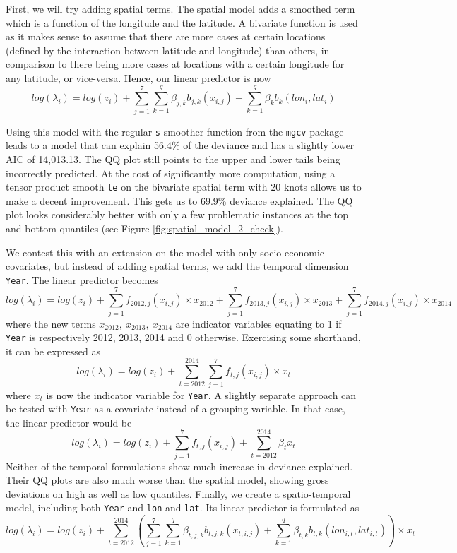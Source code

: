 First, we will try adding spatial terms. The spatial model adds a smoothed term which is a function of the longitude and the latitude. A bivariate function is used as it makes sense to assume that there are more cases at certain locations (defined by the interaction between latitude and longitude) than others, in comparison to there being more cases at
locations with a certain longitude for any latitude, or vice-versa. Hence, our linear predictor is now
$$
log(\lambda_i) = log(z_i) +  \sum_{j=1}^{7}\sum_{k=1}^{q}\beta_{j,k}b_{j,k}(x_{i,j}) + \sum_{k=1}^{q}\beta_{k}b_{k}(lon_i , lat_i) 
$$

Using this model with the regular \texttt{s} smoother function from the \texttt{mgcv} package leads to a model that can explain 56.4\% of the deviance and has a slightly lower AIC of 14,013.13. The QQ plot still points to the upper and lower tails being incorrectly predicted. At the cost of significantly more computation, using a tensor product smooth \texttt{te} on the bivariate spatial term with 20 knots allows us to make a decent improvement. This gets us to 69.9\% deviance explained. The QQ plot looks considerably better with only a few problematic instances at the top and bottom quantiles (see Figure \ref{fig:spatial_model_2_check}).

We contest this with an extension on the model with only socio-economic covariates, but instead of adding spatial terms, we add the temporal dimension \texttt{Year}. The linear predictor becomes
$$
log(\lambda_i) = log(z_i) +  \sum_{j=1}^{7}f_{2012, j}(x_{i,j})\times x_{2012}  + \sum_{j=1}^{7}f_{2013, j}(x_{i,j})\times x_{2013} +  \sum_{j=1}^{7}f_{2014, j}(x_{i,j})\times x_{2014}
$$
where the new terms $x_{2012},\ x_{2013},\ x_{2014}$ are indicator variables equating to 1 if \texttt{Year} is respectively 2012, 2013, 2014 and 0 otherwise. Exercising some shorthand, it can be expressed as
$$
log(\lambda_i) = log(z_i) +  \sum_{t=2012}^{2014}\sum_{j=1}^{7}f_{t, j}(x_{i,j})\times x_{t}
$$
where $x_t$ is now the indicator variable for \texttt{Year}. A slightly separate approach can be tested with \texttt{Year} as a covariate instead of a grouping variable. In that case, the linear predictor would be
$$
log(\lambda_i) = log(z_i) +  \sum_{j=1}^{7}f_{t, j}(x_{i,j}) + \sum_{t=2012}^{2014}\beta_t x_t
$$
Neither of the temporal formulations show much increase in deviance explained. Their QQ plots are also much worse than the spatial model, showing gross deviations on high as well as low quantiles. Finally, we create a spatio-temporal model, including both \texttt{Year} and \texttt{lon} and \texttt{lat}. Its linear predictor is formulated as
$$
log(\lambda_i) = log(z_i) +  \sum_{t=2012}^{2014}\left( \sum_{j=1}^{7}\sum_{k=1}^{q}\beta_{t,j,k}b_{t,j,k}(x_{t,i,j}) + \sum_{k=1}^{q}\beta_{t,k}b_{t,k}(lon_{i,t} , lat_{i,t}) \right) \times x_{t}
$$

